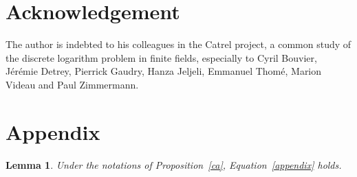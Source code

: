 \documentclass[a4wide]{article}
\theoremstyle{plain}
\newtheorem{lem}[theo]{Lemma}
\theoremstyle{definition}
\theoremstyle{remark}
\begin{document}
\section*{Acknowledgement}
The author is indebted to his colleagues in the Catrel project, a common
study of the discrete logarithm problem in finite
fields, especially to Cyril Bouvier, Jérémie Detrey, Pierrick Gaudry, Hanza Jeljeli,
Emmanuel Thomé, Marion Videau and Paul Zimmermann. 







\appendix
\section{Appendix}

\begin{lem}\label{lem_appendix}
	Under the notations of Proposition~\ref{ca}, Equation~\ref{appendix} holds.
\end{lem}
\end{document}
